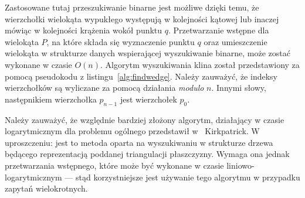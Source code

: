 




Zastosowane tutaj przeszukiwanie binarne jest możliwe dzięki temu, że
wierzchołki wielokąta wypukłego występują w kolejności kątowej lub
inaczej mówiąc w kolejności krążenia wokół punktu $q$. Przetwarzanie
wstępne dla wielokąta $P$, na które składa się wyznaczenie punktu $q$
oraz umieszczenie wielokąta w strukturze danych wspierającej
wyszukiwanie binarne, może zostać wykonane w czasie $O(n)$. Algorytm
wyszukiwania klina został przedstawiony za pomocą pseudokodu z
listingu~\ref{alg:findwedge}. Należy zauważyć, że indeksy wierzchołków
są wyliczane za pomocą działania \emph{modulo} $n$. Innymi słowy,
następnikiem wierzchołka $p_{n-1}$ jest wierzchołek $p_0$.

Należy zauważyć, że względnie bardziej złożony algorytm, działający w
czasie logarytmicznym dla problemu ogólnego przedstawił
w~\cite{Kirk83} Kirkpatrick. W uproszczeniu: jest to metoda oparta na
wyszukiwaniu w strukturze drzewa będącego reprezentacją poddanej
triangulacji płaszczyzny. Wymaga ona jednak przetwarzania wstępnego,
które może być wykonane w czasie liniowo-logarytmicznym --- stąd
korzystniejsze jest używanie tego algorytmu w przypadku zapytań
wielokrotnych.


